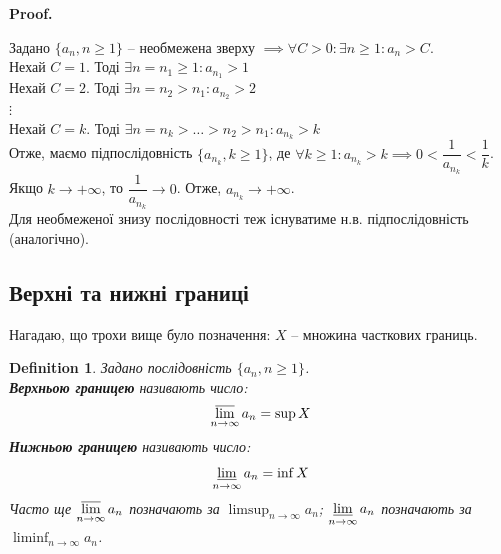 \documentclass[a4paper, 14pt]{article}
\makeatletter
\def\qed{$\blacksquare$}
\theoremstyle{theoremdd}
\theoremstyle{theoremdd}
\newtheorem{definition}[theorem]{Definition}
\theoremstyle{theoremdd}
\theoremstyle{theoremdd}
\theoremstyle{theoremdd}
\theoremstyle{theoremdd}
\theoremstyle{theoremdd}
\theoremstyle{theoremdd}
\renewenvironment{proof}[1][Proof.\\]{\par
\pushQED{\hfill \qed}%
\normalfont \topsep6\p@\@plus6\p@\relax
\trivlist
\item\relax
{\bfseries
#1\@addpunct{.}}\hspace\labelsep\ignorespaces
}{%
\popQED\endtrivlist\@endpefalse
}
\makeatother
\begin{document}
	\begin{proof}
	Задано $\{a_n, n \geq 1\}$ -- необмежена зверху $\implies \forall C > 0: \exists n \geq 1: a_n > C$.\\
	Нехай $C = 1$. Тоді $\exists n = n_1 \geq 1: a_{n_1} > 1$\\
	Нехай $C = 2$. Тоді $\exists n = n_2 > n_1: a_{n_2} > 2$\\
	$\vdots$\\
	Нехай $C = k$. Тоді $\exists n = n_k > \dots > n_2 > n_1: a_{n_k} > k$\\
	Отже, маємо підпослідовність $\{a_{n_k}, k \geq 1\}$, де $\forall k \geq 1: a_{n_k} > k \implies 0 <\dfrac{1}{a_{n_k}} < \dfrac{1}{k}$. Якщо $k \to +\infty$, то $\dfrac{1}{a_{n_k}} \to 0$. Отже, $a_{n_k} \to +\infty$.\bigskip \\
	Для необмеженої знизу послідовності теж існуватиме н.в. підпослідовність (аналогічно).
	\end{proof}
	
	\subsection{Верхні та нижні границі}
	Нагадаю, що трохи вище було позначення: $X$ -- множина часткових границь.
	
	\begin{definition} Задано послідовність $\{a_n, n \geq 1\}$.\\
	\textbf{Верхньою границею} називають число:
	\begin{align*}
	\displaystyle \varlimsup_{n \to \infty} a_n = \sup X
	\end{align*}
	\textbf{Нижньою границею} називають число:
	\begin{align*}
	\displaystyle \varliminf_{n \to \infty} a_n = \inf X
	\end{align*}
	Часто ще $\displaystyle\varlimsup_{n \to \infty} a_n$ позначають за $\displaystyle\limsup_{n \to \infty} a_n$; \qquad $\displaystyle\varliminf_{n \to \infty} a_n$ позначають за $\displaystyle\liminf_{n \to \infty} a_n$.
	\end{definition}
	
\end{document}

